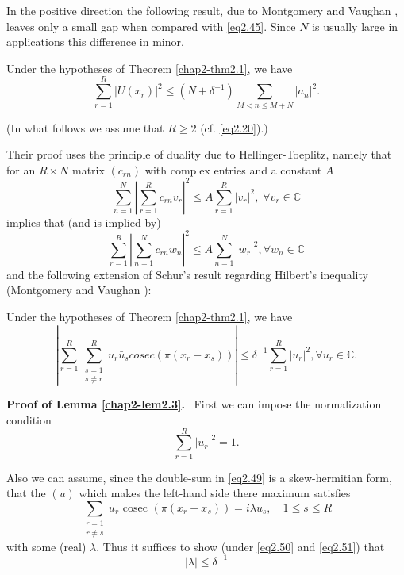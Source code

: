 In the positive direction the following result, due to Montgomery and
Vaughan \cite{key2}, leaves only a small gap when compared with
\eqref{eq2.45}. Since $N$ is usually\pageoriginale 
large in applications this difference in minor.
 
\begin{theorem}\label{chap2-thm2.3} %
Under the hypotheses of Theorem \ref{chap2-thm2.1}, we have 
\begin{equation*}
\sum_{r=1}^{R} |U(x_r)|^2 \leq ( N+\delta^{-1}) \sum_{M < n \leq M+N}
|a_n|^2. \tag{2.46}\label{eq2.46} 
\end{equation*}
\end{theorem}

(In what follows we assume that $R \geq 2$ (cf. \eqref{eq2.20}).)

Their proof uses the principle of duality due to Hellinger-Toeplitz,
namely that for an $R \times N$ matrix $(c_{rn})$ with complex entries
and a constant $A$ 
\begin{equation*}
\sum_{n=1}^{N}| \sum_{r=1}^{R} c_{rn}v_r |^2 \le A \sum_{r=1}^{R}
|v_r|^2, \; \forall v_r \in  \mathbb{C} \tag{2.47}\label{eq2.47} 
\end{equation*} 
implies that (and is implied by)
\begin{equation*}
\sum_{r=1}^{R}| \sum_{n=1}^{N} c_{rn}w_n |^2 \leq A \sum_{n=1}^{N}
|w_r|^2,\forall w_n \in  \mathbb{C} \tag{2.48}\label{eq2.48} 
\end{equation*}
and the following extension of Schur's result regarding Hilbert's
inequality (Montgomery and Vaughan \cite{key1}): 

\begin{lemma}\label{chap2-lem2.3} %
Under the hypotheses of Theorem \ref{chap2-thm2.1}, we have 
\begin{equation*}
|\sum_{r=1}^{R} \sum_{\substack{s=1 \\ s \neq r}}^{R} u_r \bar{u}_s
cosec ( \pi(x_r -x_s )) | \le \delta^{-1} \sum_{r=1}^{R}|u_r |^2,
\forall u_r \in  \mathbb{C}. \tag{2.49}\label{eq2.49} 
\end{equation*}
\end{lemma}

\noindent
{\bf Proof of Lemma \ref{chap2-lem2.3}.}~
First we can impose the normalization condition
\begin{equation*}
\sum_{r=1}^{R} |u_r|^2 =1. \tag{2.50}\label{eq2.50}
\end{equation*}

Also we can assume, since the double-sum in \eqref{eq2.49} is a
skew-hermitian form, that the $(u)$ which makes the left-hand side
there maximum satisfies 
\begin{equation*}
\sum_{\substack{r=1 \\ r \neq s}} u_r \text{ cosec } (\pi (x_r-x_s)) = i \lambda u_s, \quad 1 \leq s \leq R \tag{2.51}\label{eq2.51}
\end{equation*}
with some (real) $\lambda$. Thus it suffices to show (under  \eqref{eq2.50}
and \eqref{eq2.51}) that 
\begin{equation*}
| \lambda |\leq \delta^{-1} \tag{2.52}\label{eq2.52}
\end{equation*}\pageoriginale

